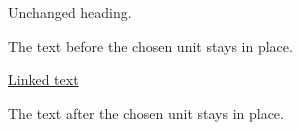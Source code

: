 \documentclass[11pt]{article}
\begin{document}
Unchanged heading.

The text before the chosen unit stays in place.

\href{https://example.invalid}{Linked text}


\par\vspace{25mm}
The text after the chosen unit stays in place.
\end{document}
